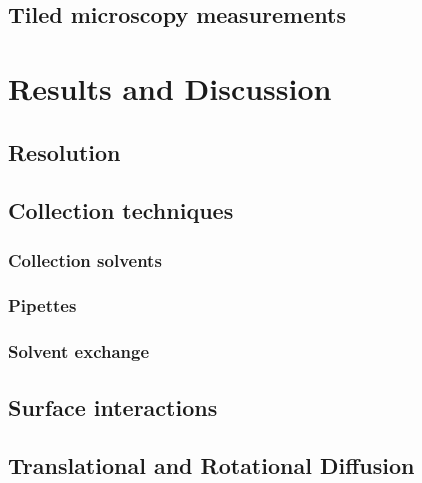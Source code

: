 \subsection{Tiled microscopy measurements}
\label{sec:tiled-microscopy}

\section{Results and Discussion}

\subsection{Resolution}

\subsection{Collection techniques}
\label{sec:rod-collection-techniques}

\subsubsection{Collection solvents}

\subsubsection{Pipettes}

\subsubsection{Solvent exchange}

\subsection{Surface interactions}
\label{sec:surface-interact}

\subsection{Translational and Rotational Diffusion}


